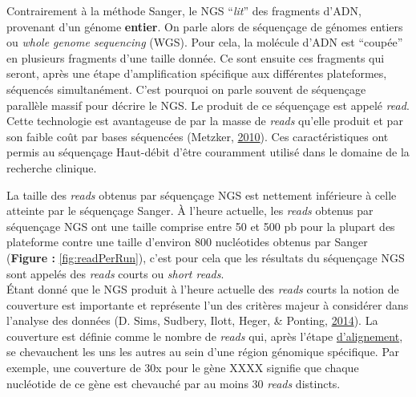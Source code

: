 \documentclass[12pt,twoside]{reedthesis}
\theoremstyle{definition}
\theoremstyle{definition}
\theoremstyle{remark}
\begin{document}
  Contrairement à la méthode Sanger, le NGS ``\emph{lit}'' des fragments
  d'ADN, provenant d'un génome \textbf{entier}. On parle alors de
  séquençage de génomes entiers ou \emph{whole genome sequencing} (WGS).
  Pour cela, la molécule d'ADN est ``coupée'' en plusieurs fragments d'une
  taille donnée. Ce sont ensuite ces fragments qui seront, après une étape
  d'amplification spécifique aux différentes plateformes, séquencés
  simultanément. C'est pourquoi on parle souvent de séquençage parallèle
  massif pour décrire le NGS. Le produit de ce séquençage est appelé
  \emph{read}. Cette technologie est avantageuse de par la masse de
  \emph{reads} qu'elle produit et par son faible coût par bases séquencées
  (Metzker, \protect\hyperlink{ref-Metzker2010}{2010}). Ces
  caractéristiques ont permis au séquençage Haut-débit d'être couramment
  utilisé dans le domaine de la recherche clinique.
  
  La taille des \emph{reads} obtenus par séquençage NGS est nettement
  inférieure à celle atteinte par le séquençage Sanger. À l'heure
  actuelle, les \emph{reads} obtenus par séquençage NGS ont une taille
  comprise entre 50 et 500 pb pour la plupart des plateforme contre une
  taille d'environ 800 nucléotides obtenus par Sanger (\textbf{Figure :}
  \ref{fig:readPerRun}), c'est pour cela que les résultats du séquençage
  NGS sont appelés des \emph{reads} courts ou \emph{short reads}.\\
  Étant donné que le NGS produit à l'heure actuelle des \emph{reads}
  courts la notion de couverture est importante et représente l'un des
  critères majeur à considérer dans l'analyse des données (D. Sims,
  Sudbery, Ilott, Heger, \& Ponting,
  \protect\hyperlink{ref-Sims2014}{2014}). La couverture est définie comme
  le nombre de \emph{reads} qui, après l'étape
  \protect\hyperlink{lalignement}{d'alignement}, se chevauchent les uns
  les autres au sein d'une région génomique spécifique. Par exemple, une
  couverture de 30x pour le gène XXXX signifie que chaque nucléotide de ce
  gène est chevauché par au moins 30 \emph{reads} distincts.
  
  \newpage
  
\end{document}
